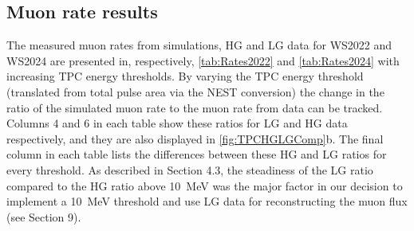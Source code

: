 \subsection{Muon rate results}\label{sec:Muons/MuonRateResults}
The measured muon rates from simulations, HG and LG data for WS2022 and WS2024 are presented in, respectively, \autoref{tab:Rates2022} and \autoref{tab:Rates2024} with increasing TPC energy thresholds. By varying the TPC energy threshold (translated from total pulse area via the NEST conversion) the change in the ratio of the simulated muon rate to the muon rate from data can be tracked. Columns 4 and 6 in each table show these ratios for LG and HG data respectively, and they are also displayed in \autoref{fig:TPCHGLGComp}b. The final column in each table lists the differences between these HG and LG ratios for every threshold. As described in Section 4.3, the steadiness of the LG ratio compared to the HG ratio above 10~MeV was the major factor in our decision to implement a 10~MeV threshold and use LG data for reconstructing the muon flux (see Section 9).

